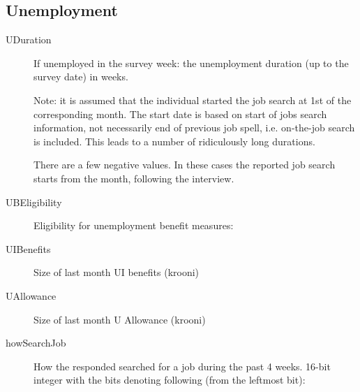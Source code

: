 \documentclass[a4paper]{article}
\begin{document}
\subsection{Unemployment}
\label{sec:unemployment}

\begin{description}
\item[UDuration] If unemployed in the survey week: the unemployment
  duration (up to the survey date) in weeks.

  Note: it is assumed that the individual started the job search at
  1st of the corresponding month.  The start date is based on start of
  jobs search information, not necessarily end of previous job spell,
  i.e. on-the-job search is included.  This leads to a number of
  ridiculously long durations.

  There are a few negative values.  In these cases the reported job
  search starts from the month, following the interview.
\item[UBEligibility] Eligibility for unemployment benefit measures:
\item[UIBenefits] Size of last month UI benefits (krooni)
\item[UAllowance] Size of last month U Allowance (krooni)
\item[howSearchJob] How the responded searched for a job during the
  past 4 weeks.  16-bit integer with the bits denoting following (from
  the leftmost bit):
\end{description}
\end{document}
